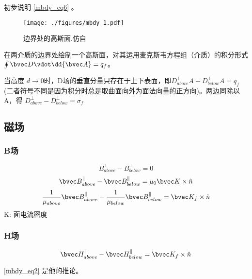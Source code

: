 \begin{example}{}
初步说明 \autoref{mbdy_eq6} 。
\begin{figure}[ht]
\centering
\texttt{[image: ./figures/mbdy\_1.pdf]}
\caption{边界处的高斯面.仿自\cite{GriffE}} \label{mbdy_fig1}
\end{figure}
在两介质的边界处绘制一个高斯面，对其运用麦克斯韦方程组（介质）的积分形式 $\oint \bvec D \vdot \dd{\bvec A} = q_f$。

当高度 $d\rightarrow0$时，D场的垂直分量只存在于上下表面，即$D^\perp_{above} A- D^\perp_{below} A= q_f$ (二者符号不同是因为积分时总是取曲面向外为面法向量的正方向)。两边同除以A，得 $D^\perp_{above} - D^\perp_{below} = \sigma_f$
\end{example}


\subsection{磁场}

\subsubsection{B场}
\begin{equation}
B^\perp_{above} - B^\perp_{below} = 0
\end{equation}
\begin{equation}
\bvec B^\parallel_{above} - \bvec B^\parallel_{below} = \mu_0\bvec K \times \hat n 
\end{equation}
\begin{equation}\label{mbdy_eq2}
\frac{1}{\mu_{above}}\bvec B^\parallel_{above} - \frac{1}{\mu_{below}} \bvec B^\parallel_{below} = \bvec K_f \times \hat n 
\end{equation}
K: 面电流密度

\subsubsection{H场}
\begin{equation}
\bvec H^\parallel_{above} - \bvec H^\parallel_{below} = \bvec K_f \times \hat n 
\end{equation}

\autoref{mbdy_eq2}  是他的推论。

